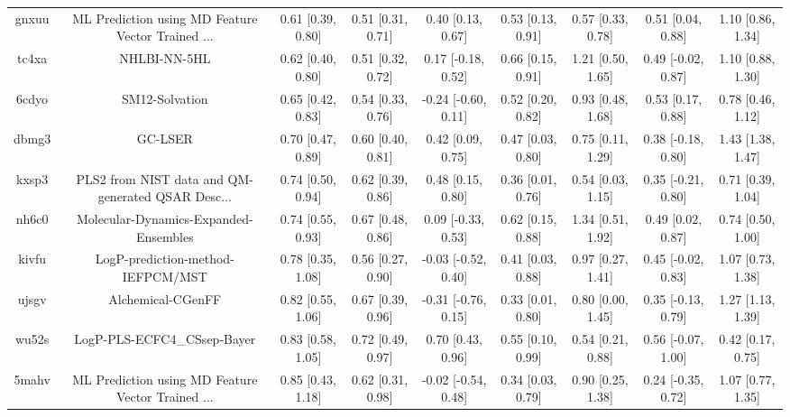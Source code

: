 \documentclass{article}
\begin{document}
\begin{center}
\begin{longtable}{|ccccccccc|}
 gnxuu &  ML Prediction using MD Feature Vector Trained ... &  0.61 [0.39, 0.80] &  0.51 [0.31, 0.71] &     0.40 [0.13, 0.67] &  0.53 [0.13, 0.91] &    0.57 [0.33, 0.78] &    0.51 [0.04, 0.88] &     1.10 [0.86, 1.34] \\
 tc4xa &                                       NHLBI-NN-5HL &  0.62 [0.40, 0.80] &  0.51 [0.32, 0.72] &    0.17 [-0.18, 0.52] &  0.66 [0.15, 0.91] &    1.21 [0.50, 1.65] &   0.49 [-0.02, 0.87] &     1.10 [0.88, 1.30] \\
 6cdyo &                                     SM12-Solvation &  0.65 [0.42, 0.83] &  0.54 [0.33, 0.76] &   -0.24 [-0.60, 0.11] &  0.52 [0.20, 0.82] &    0.93 [0.48, 1.68] &    0.53 [0.17, 0.88] &     0.78 [0.46, 1.12] \\
 dbmg3 &                                            GC-LSER &  0.70 [0.47, 0.89] &  0.60 [0.40, 0.81] &     0.42 [0.09, 0.75] &  0.47 [0.03, 0.80] &    0.75 [0.11, 1.29] &   0.38 [-0.18, 0.80] &     1.43 [1.38, 1.47] \\
 kxsp3 &  PLS2 from NIST data and QM-generated QSAR Desc... &  0.74 [0.50, 0.94] &  0.62 [0.39, 0.86] &     0.48 [0.15, 0.80] &  0.36 [0.01, 0.76] &    0.54 [0.03, 1.15] &   0.35 [-0.21, 0.80] &     0.71 [0.39, 1.04] \\
 nh6c0 &              Molecular-Dynamics-Expanded-Ensembles &  0.74 [0.55, 0.93] &  0.67 [0.48, 0.86] &    0.09 [-0.33, 0.53] &  0.62 [0.15, 0.88] &    1.34 [0.51, 1.92] &    0.49 [0.02, 0.87] &     0.74 [0.50, 1.00] \\
 kivfu &                  LogP-prediction-method-IEFPCM/MST &  0.78 [0.35, 1.08] &  0.56 [0.27, 0.90] &   -0.03 [-0.52, 0.40] &  0.41 [0.03, 0.88] &    0.97 [0.27, 1.41] &   0.45 [-0.02, 0.83] &     1.07 [0.73, 1.38] \\
 ujsgv &                                  Alchemical-CGenFF &  0.82 [0.55, 1.06] &  0.67 [0.39, 0.96] &   -0.31 [-0.76, 0.15] &  0.33 [0.01, 0.80] &    0.80 [0.00, 1.45] &   0.35 [-0.13, 0.79] &     1.27 [1.13, 1.39] \\
 wu52s &                        LogP-PLS-ECFC4\_CSsep-Bayer &  0.83 [0.58, 1.05] &  0.72 [0.49, 0.97] &     0.70 [0.43, 0.96] &  0.55 [0.10, 0.99] &    0.54 [0.21, 0.88] &   0.56 [-0.07, 1.00] &     0.42 [0.17, 0.75] \\
 5mahv &  ML Prediction using MD Feature Vector Trained ... &  0.85 [0.43, 1.18] &  0.62 [0.31, 0.98] &   -0.02 [-0.54, 0.48] &  0.34 [0.03, 0.79] &    0.90 [0.25, 1.38] &   0.24 [-0.35, 0.72] &     1.07 [0.77, 1.35] \\

\end{longtable}
\end{center}
\end{document}
